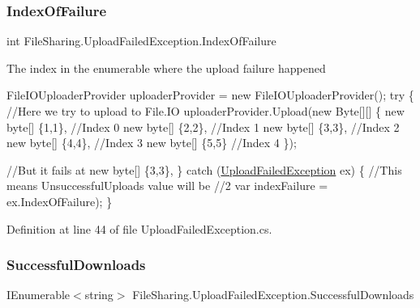 \subsubsection{\texorpdfstring{Index\+Of\+Failure}{IndexOfFailure}}
{\footnotesize\ttfamily int File\+Sharing.\+Upload\+Failed\+Exception.\+Index\+Of\+Failure\hspace{0.3cm}{\ttfamily [get]}}



The index in the enumerable where the upload failure happened 


\begin{DoxyCode}
FileIOUploaderProvider uploaderProvider = \textcolor{keyword}{new} FileIOUploaderProvider();
\textcolor{keywordflow}{try}
\{
    \textcolor{comment}{//Here we try to upload to File.IO}
    uploaderProvider.Upload(\textcolor{keyword}{new} Byte[][]
                            \{
                            \textcolor{keyword}{new} byte[] \{1,1\}, \textcolor{comment}{//Index 0}
                            \textcolor{keyword}{new} byte[] \{2,2\}, \textcolor{comment}{//Index 1}
                            \textcolor{keyword}{new} byte[] \{3,3\}, \textcolor{comment}{//Index 2}
                            \textcolor{keyword}{new} byte[] \{4,4\}, \textcolor{comment}{//Index 3}
                            \textcolor{keyword}{new} byte[] \{5,5\}  \textcolor{comment}{//Index 4}
                            \});

    \textcolor{comment}{//But it fails at new byte[] \{3,3\},}
\}
\textcolor{keywordflow}{catch} (\hyperlink{class_file_sharing_1_1_upload_failed_exception_a695f2b76a11171b4ac7b749eeeb8f09b}{UploadFailedException} ex)
\{
    \textcolor{comment}{//This means UnsuccessfulUploads value will be }
    \textcolor{comment}{//2}
    var indexFailure = ex.IndexOfFailure);
\}        
\end{DoxyCode}
 

Definition at line 44 of file Upload\+Failed\+Exception.\+cs.

\mbox{\label{class_file_sharing_1_1_upload_failed_exception_a95a4b29d6b42b184e5c66659e3873e71}} 
\subsubsection{\texorpdfstring{Successful\+Downloads}{SuccessfulDownloads}}
{\footnotesize\ttfamily I\+Enumerable$<$string$>$ File\+Sharing.\+Upload\+Failed\+Exception.\+Successful\+Downloads\hspace{0.3cm}{\ttfamily [get]}}



